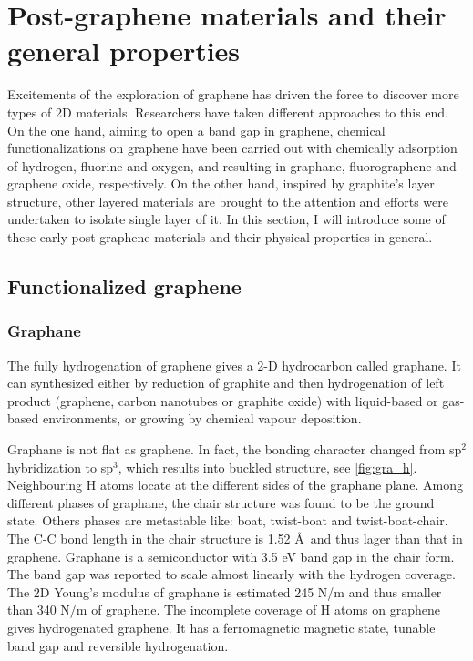 \section{Post-graphene materials and their general properties}

Excitements of the exploration of graphene has driven the force to discover more types of 2D materials. Researchers have taken different approaches to this end. On the one hand, aiming to open a band gap in graphene, chemical functionalizations on graphene have been carried out with chemically adsorption of hydrogen, fluorine and oxygen, and resulting in graphane, fluorographene and graphene oxide, respectively. On the other hand, inspired by graphite's layer structure, other layered materials are brought to the attention and efforts were undertaken to isolate single layer of it. In this section, I will introduce some of these early post-graphene materials and their physical properties in general.

\subsection{Functionalized graphene}

\subsubsection{Graphane}

The fully hydrogenation of graphene gives a 2-D hydrocarbon called graphane. It can synthesized either by reduction of graphite and then hydrogenation of left product (graphene, carbon nanotubes or graphite oxide) with liquid-based\cite{Yang2012} or gas-based\cite{Burgess2011} environments, or growing by chemical vapour deposition\cite{wang2010}. 

Graphane is not flat as graphene. In fact, the bonding character changed from sp$^2$ hybridization to sp$^3$, which results into buckled structure, see \autoref{fig:gra_h}. Neighbouring H atoms locate at the different sides of the graphane plane. Among different phases of graphane, the chair structure was found to be the ground state. Others phases are metastable like: boat, twist-boat and twist-boat-chair\cite{Samarakoon2009}. The C-C bond length in the chair structure is 1.52 \AA~and thus lager than that in graphene. Graphane is a semiconductor with 3.5 eV band gap in the chair form. The band gap was reported to scale almost linearly with the hydrogen coverage\cite{Ilyin2011}. The 2D Young's modulus of graphane is estimated 245 \si{N/m}\cite{Munoz2010} and thus smaller than 340 \si{N/m} of graphene. The incomplete coverage of H atoms on graphene gives hydrogenated graphene. It has a ferromagnetic magnetic state\cite{Zhou2009}, tunable band gap\cite{Shkrebtii2011} and reversible hydrogenation\cite{Elias2009}. 

